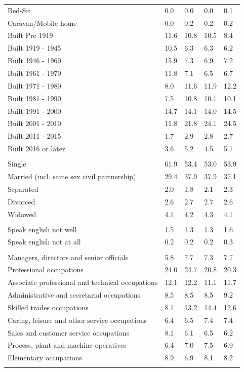 \documentclass{article}
\begin{document}
\begin{table}[h]
\begin{tabular}{KTTTT}
Bed-Sit & 0.0& 0.0& 0.0& 0.1\\
Caravan/Mobile home & 0.0& 0.2& 0.2& 0.2\\
    \hline
Built Pre 1919 & 11.6& 10.8& 10.5&  8.4\\
Built 1919 - 1945 & 10.5&  6.3&  6.3&  6.2\\
Built  1946 - 1960 & 15.9&  7.3&  6.9&  7.2\\
Built  1961 - 1970 & 11.8&  7.1&  6.5&  6.7\\
Built  1971 - 1980 &  8.0& 11.6& 11.9& 12.2\\
Built  1981 - 1990 &  7.5& 10.8& 10.1& 10.1\\
Built  1991 - 2000 & 14.7& 14.1& 14.0& 14.5\\
Built  2001 - 2010 & 11.8& 21.8& 24.1& 24.5\\
Built  2011 - 2015 & 1.7& 2.9& 2.8& 2.7\\
Built  2016 or later & 3.6& 5.2& 4.5& 5.1\\
\hline
    \\
    \hline
Single & 61.9& 53.4& 53.0& 53.9\\
Married (incl. same sex civil partnership) & 29.4& 37.9& 37.9& 37.1\\
Separated  & 2.0& 1.8& 2.1& 2.3\\
Divorced  & 2.6& 2.7& 2.7& 2.6\\
Widowed & 4.1& 4.2& 4.3& 4.1\\
\hline
    \\ 
    \hline
Speak english not well & 1.5& 1.3& 1.3& 1.6\\
Speak english not at all & 0.2& 0.2& 0.2& 0.3\\
\hline
    \\
    \hline
Managers, directors and senior officials & 5.8& 7.7& 7.3& 7.7\\
Professional occupations & 24.0& 24.7& 20.8& 20.3\\
Associate professional and technical occupations & 12.1& 12.2& 11.1& 11.7\\
Administrative and secretarial occupations & 8.5& 8.5& 8.5& 9.2\\
Skilled trades occupations &  8.1& 13.2& 14.4& 12.6\\
Caring, leisure and other service occupations & 6.4& 6.5& 7.4& 7.4\\
Sales and customer service occupations & 8.1& 6.1& 6.5& 6.2\\
Process, plant and machine operatives & 6.4& 7.0& 7.5& 6.9\\
Elementary occupations & 8.9& 6.9& 8.1& 8.2\\
\hline
\end{tabular}
\end{table}
\end{document}
